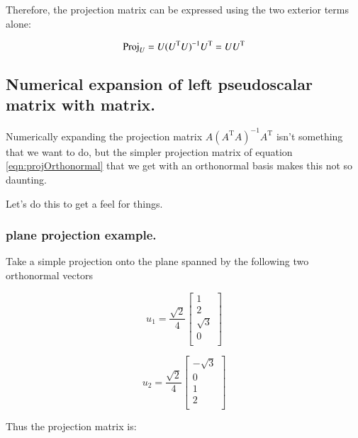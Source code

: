 \documentclass{article}      %
\newcommand{\transpose}[1]{{{#1}^{\text{T}}}}
\begin{document}
Therefore, the projection matrix can be expressed using the two exterior terms alone:

\begin{equation}\label{eqn:projOrthonormal}
\Proj_U = U (\transpose{U} U)^{-1} \transpose{U} = U \transpose{U}
\end{equation}

\subsection{ Numerical expansion of left pseudoscalar matrix with matrix.}

Numerically expanding the projection matrix $A (\transpose{A} A)^{-1}\transpose{A}$ isn't something
that we want to do, but the simpler projection matrix of equation
\ref{eqn:projOrthonormal} that we get with an orthonormal basis makes this not so daunting.

Let's do this to get a feel for things.

\subsubsection{  plane projection example. }

Take a simple projection onto the plane spanned by the following two orthonormal vectors

\[
u_1 = 
\frac{\sqrt{2}}{4}
\begin{bmatrix}
1 \\
2 \\
\sqrt{3} \\
0 \\
\end{bmatrix}
\]

\[
u_2 = 
\frac{\sqrt{2}}{4}
\begin{bmatrix}
-\sqrt{3} \\
0 \\
1 \\
2 \\
\end{bmatrix}
\]

Thus the projection matrix is:
\end{document}
